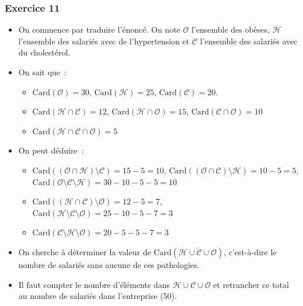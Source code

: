 \documentclass[10pt,notheorems]{beamer}
\theoremstyle{plain}
\theoremstyle{definition} %
\begin{document}
\begin{frame}
  \frametitle{Exercice 11}
  \fontsize{8}{10}\selectfont

  \begin{itemize}
  \item On commence par traduire l'énoncé. On note $\mathcal O$ l'ensemble des obèses, $\mathcal H$ l'ensemble des salariés avec de l'hypertension et $\mathcal C$ l'ensemble des salariés avec du cholestérol.\newline
  \item On sait que~:
    \begin{itemize}
    \item $\mathrm{Card}(\mathcal O) = 30$, $\mathrm{Card}(\mathcal H) = 25$, $\mathrm{Card}(\mathcal C) = 20$.
    \item $\mathrm{Card}(\mathcal H \cap \mathcal C) = 12$, $\mathrm{Card}(\mathcal H \cap \mathcal O) = 15$, $\mathrm{Card}(\mathcal C \cap \mathcal O) = 10$
    \item $\mathrm{Card}(\mathcal H \cap \mathcal C \cap \mathcal O) = 5$\newline
    \end{itemize}
  \item On peut déduire~:
    \begin{itemize}
    \item $\mathrm{Card}((\mathcal O \cap \mathcal H)\setminus\mathcal C) = 15-5 = 10$, $\mathrm{Card}((\mathcal O \cap \mathcal C)\setminus\mathcal H) = 10-5 = 5$, $\mathrm{Card}(\mathcal O \setminus\mathcal C \setminus\mathcal H) = 30-10-5-5 = 10$
    \item $\mathrm{Card}((\mathcal H \cap \mathcal C)\setminus\mathcal O) = 12-5 = 7$, $\mathrm{Card}(\mathcal H \setminus\mathcal C \setminus \mathcal O) = 25-10-5-7 = 3$
    \item $\mathrm{Card}(\mathcal C \setminus\mathcal H \setminus \mathcal O) = 20-5-5-7 = 3$\newline
    \end{itemize}
  \item On cherche à déterminer la valeur de $\mathrm{Card}(\overline{\mathcal H \cup \mathcal C \cup \mathcal O})$, c'est-à-dire le nombre de salariés sans aucune de ces pathologies.\newline
  \item Il faut compter le nombre d'éléments dans $\mathcal H \cup \mathcal C \cup \mathcal O$ et retrancher ce total au nombre de salariés dans l'entreprise (50).\newline
  \end{itemize}

\end{frame}
\end{document}

